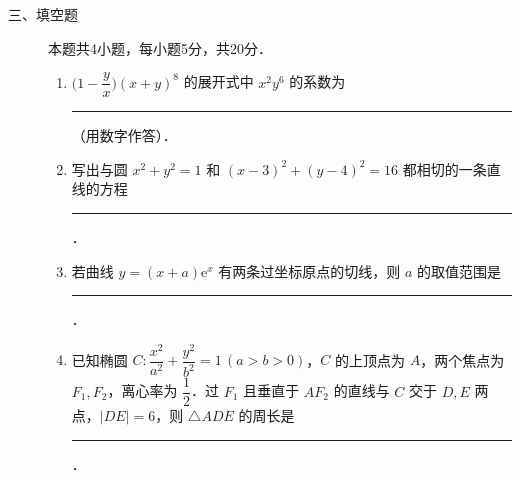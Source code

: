 \begin{description}
    \item[三、填空题] 本题共4小题，每小题5分，共20分．
    \begin{enumerate}[leftmargin=5pt]
      \addtocounter{enumi}{+12}
        \item $\bigl(1-\dfrac{y}{x}\bigr)(x+y)^8$ 的展开式中 $x^2y^6$ 的系数为 \rule[-0.3ex]{3em}{0.4pt}（用数字作答）．
        \item 写出与圆 $x^2+y^2=1$ 和 $(x-3)^2+(y-4)^2=16$ 都相切的一条直线的方程 \rule[-0.3ex]{3em}{0.4pt}．
        \item 若曲线 $y=(x+a)\mathrm{e}^x$ 有两条过坐标原点的切线，则 $a$ 的取值范围是 \rule[-0.3ex]{3em}{0.4pt}．
        \item 已知椭圆 $C:\dfrac{x^2}{a^2}+\dfrac{y^2}{b^2}=1\,(a>b>0)$，$C$ 的上顶点为 $A$，两个焦点为 $F_1,F_2$，离心率为 $\dfrac{1}{2}$．过 $F_1$ 且垂直于 $AF_2$ 的直线与 $C$ 交于 $D,E$ 两点，$|DE|=6$，则 $\triangle ADE$ 的周长是 \rule[-0.3ex]{3em}{0.4pt}．
    \end{enumerate}
\end{description}

